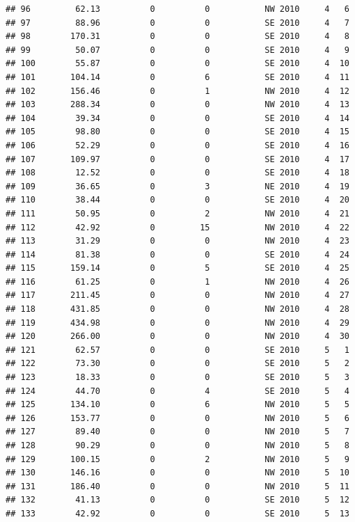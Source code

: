\documentclass[
]{article}
\begin{document}
\begin{verbatim}
## 96         62.13          0          0           NW 2010     4   6
## 97         88.96          0          0           SE 2010     4   7
## 98        170.31          0          0           SE 2010     4   8
## 99         50.07          0          0           SE 2010     4   9
## 100        55.87          0          0           SE 2010     4  10
## 101       104.14          0          6           SE 2010     4  11
## 102       156.46          0          1           NW 2010     4  12
## 103       288.34          0          0           NW 2010     4  13
## 104        39.34          0          0           SE 2010     4  14
## 105        98.80          0          0           SE 2010     4  15
## 106        52.29          0          0           SE 2010     4  16
## 107       109.97          0          0           SE 2010     4  17
## 108        12.52          0          0           SE 2010     4  18
## 109        36.65          0          3           NE 2010     4  19
## 110        38.44          0          0           SE 2010     4  20
## 111        50.95          0          2           NW 2010     4  21
## 112        42.92          0         15           NW 2010     4  22
## 113        31.29          0          0           NW 2010     4  23
## 114        81.38          0          0           SE 2010     4  24
## 115       159.14          0          5           SE 2010     4  25
## 116        61.25          0          1           NW 2010     4  26
## 117       211.45          0          0           NW 2010     4  27
## 118       431.85          0          0           NW 2010     4  28
## 119       434.98          0          0           NW 2010     4  29
## 120       266.00          0          0           NW 2010     4  30
## 121        62.57          0          0           SE 2010     5   1
## 122        73.30          0          0           SE 2010     5   2
## 123        18.33          0          0           SE 2010     5   3
## 124        44.70          0          4           SE 2010     5   4
## 125       134.10          0          6           NW 2010     5   5
## 126       153.77          0          0           NW 2010     5   6
## 127        89.40          0          0           NW 2010     5   7
## 128        90.29          0          0           NW 2010     5   8
## 129       100.15          0          2           NW 2010     5   9
## 130       146.16          0          0           NW 2010     5  10
## 131       186.40          0          0           NW 2010     5  11
## 132        41.13          0          0           SE 2010     5  12
## 133        42.92          0          0           SE 2010     5  13

\end{verbatim}
\end{document}
